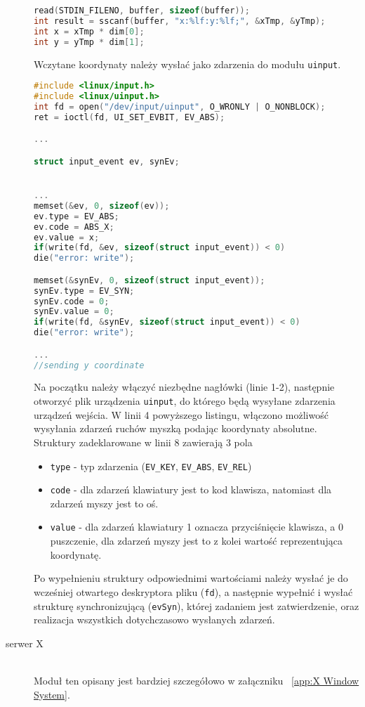 \begin{description}
\begin{lstlisting}[language=c]
read(STDIN_FILENO, buffer, sizeof(buffer));
int result = sscanf(buffer, "x:%lf:y:%lf;", &xTmp, &yTmp);
int x = xTmp * dim[0];
int y = yTmp * dim[1];
\end{lstlisting}

Wczytane koordynaty należy wysłać jako zdarzenia do modułu \lstinline{uinput}. 

\begin{lstlisting}[language=c]
#include <linux/input.h>
#include <linux/uinput.h>
int fd = open("/dev/input/uinput", O_WRONLY | O_NONBLOCK);
ret = ioctl(fd, UI_SET_EVBIT, EV_ABS);

...

struct input_event ev, synEv;


...
memset(&ev, 0, sizeof(ev));
ev.type = EV_ABS;
ev.code = ABS_X;
ev.value = x;
if(write(fd, &ev, sizeof(struct input_event)) < 0)
die("error: write");  

memset(&synEv, 0, sizeof(struct input_event));
synEv.type = EV_SYN;
synEv.code = 0;
synEv.value = 0;
if(write(fd, &synEv, sizeof(struct input_event)) < 0)
die("error: write");

...
//sending y coordinate


\end{lstlisting}
		Na początku należy włączyć niezbędne nagłówki (linie 1-2), następnie otworzyć plik urządzenia \lstinline{uinput}, do którego będą wysyłane zdarzenia urządzeń wejścia. W linii 4 powyższego listingu, włączono możliwość wysyłania zdarzeń ruchów myszką podając koordynaty absolutne. Struktury zadeklarowane w linii 8 zawierają 3 pola 
\begin{itemize}
\item \lstinline{type} - typ zdarzenia (\lstinline{EV_KEY}, \lstinline{EV_ABS}, \lstinline{EV_REL})		
\item \lstinline{code} - dla zdarzeń klawiatury jest to kod klawisza, natomiast dla zdarzeń myszy jest to oś.
\item \lstinline{value} - dla zdarzeń klawiatury 1 oznacza przyciśnięcie klawisza, a 0 puszczenie, dla zdarzeń myszy jest to z kolei wartość reprezentująca koordynatę.
\end{itemize}
		Po wypełnieniu struktury odpowiednimi wartościami należy wysłać je do wcześniej otwartego deskryptora pliku (\lstinline{fd}), a następnie wypełnić i wysłać strukturę synchronizującą (\lstinline{evSyn}), której zadaniem jest zatwierdzenie, oraz realizacja wszystkich dotychczasowo wysłanych zdarzeń. 
	\item[serwer X] \hfill \\
		Moduł ten opisany jest bardziej szczegółowo w załączniku ~\ref{app:X Window System}.


\end{description}

